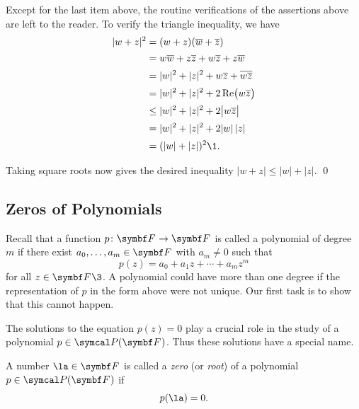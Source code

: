 
\proof
Except for the last item above, the routine verifications of the assertions above are left to the reader. To verify the triangle inequality, we have
\vspace{.05in} %
\begin{align*}
|w + z|^2 &= (w + z)(\bar{w} + \bar{z}) \\[1.5bp]
&= w \bar{w} + z \bar{z} + w \bar{z} + z \bar{w} \\[1.5bp]
&= |w|^2 + |z|^2 + w \bar{z} + \overline{w \bar{z}} \\[1.5bp]
&= |w|^2 + |z|^2 + 2 \re\paren[\big]{w \bar{z}} \\[1.5bp]
&\le |w|^2 + |z|^2 + 2 \abs[\big]{w \bar{z}} \\[1.5bp]
&= |w|^2 + |z|^2 + 2 |w| \, |z| \\[1.5bp]
&= (|w| + |z|)^2\1.
\end{align*}


\noindent Taking square roots now gives the desired inequality $|w + z| \le |w| + |z|$.
\qed

\pagebreak[3]

\subsection{Zeros of Polynomials}

Recall that a function $p \colon \F{} \to \F{}$  is called a polynomial of degree $m$ if there exist $a_0, \dots, a_m \in \F{}$ with $a_m \ne 0$ such that
\[
p(z) = a_0 + a_1 z + \cdots + a_m z^m
\]
for all $z \in \F{}\3$. A polynomial could have more than one degree if the representation of $p$ in the form above were not unique. Our first task is to show that this cannot happen.

The solutions to the equation $p(z) = 0$ play a crucial role in the study of a polynomial $p \in \P(\F{})$. Thus these solutions have a special name.

{A number $\la \in \F{}$ is called a \emph{zero} (or \emph{root}) of a polynomial $p \in \P(\F{})$ if
\[
p(\la) = 0.
\]}


